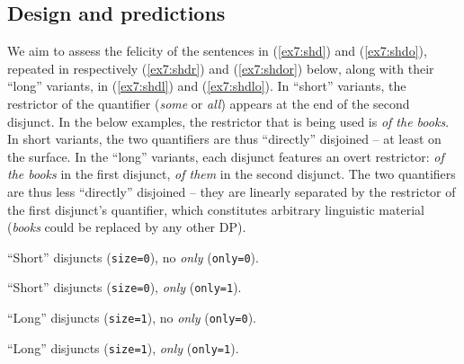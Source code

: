 \subsection{Design and predictions}

We aim to assess the felicity of the sentences in (\ref{ex7:shd}) and (\ref{ex7:shdo}), repeated in respectively (\ref{ex7:shdr}) and (\ref{ex7:shdor}) below, along with their ``long'' variants, in (\ref{ex7:shdl}) and (\ref{ex7:shdlo}). In ``short'' variants, the restrictor of the quantifier (\textit{some} or \textit{all}) appears at the end of the second disjunct. In the below examples, the restrictor that is being used is \textit{of the books}. In short variants, the two quantifiers are thus ``directly'' disjoined -- at least on the surface. In the ``long'' variants, each disjunct features an overt restrictor: \textit{of the books} in the first disjunct, \textit{of them} in the second disjunct. The two quantifiers are thus less ``directly'' disjoined -- they are linearly separated by the restrictor of the first disjunct's quantifier, which constitutes arbitrary linguistic material (\textit{books} could be replaced by any other DP).

\begin{exe}
	\ex\label{ex7:shdr}{``Short'' disjuncts (\texttt{size=0}), no \textit{only} (\texttt{only=0}).}
	\begin{xlist}
		\label{ex7:shdr-ws}
		\label{ex7:shdr-sw}
	\end{xlist}
	\ex\label{ex7:shdor}{``Short'' disjuncts (\texttt{size=0}), \textit{only} (\texttt{only=1}).}
	\begin{xlist}
		\label{ex7:shdor-ws}
		\label{ex7:shdor-sw}
	\end{xlist}
\end{exe}
\begin{exe}
	\ex\label{ex7:shdl}{``Long'' disjuncts (\texttt{size=1}), no \textit{only} (\texttt{only=0}).}
	\begin{xlist}
		\label{ex7:shdl-ws}
		\label{ex7:shdl-sw}
	\end{xlist}
	\ex\label{ex7:shdlo}{``Long'' disjuncts (\texttt{size=1}), \textit{only} (\texttt{only=1}).}
	\begin{xlist}
		\label{ex7:shdlo-ws}
		\label{ex7:shdlo-sw}
	\end{xlist}
\end{exe}


